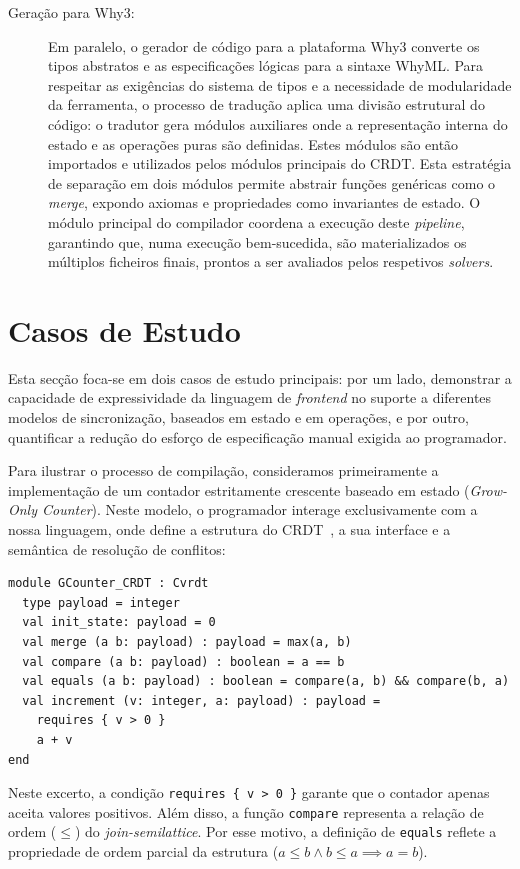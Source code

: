\documentclass{llncs}
\begin{document}
\begin{description}
\item[Geração para Why3:] Em paralelo, o gerador de código para a plataforma Why3 converte os tipos abstratos e
as especificações lógicas para a sintaxe WhyML. Para respeitar as exigências do sistema de tipos e
a necessidade de modularidade da ferramenta, o processo de tradução aplica uma divisão estrutural do código:
o tradutor gera módulos auxiliares onde a representação interna do estado e as operações puras são definidas.
Estes módulos são então importados e utilizados pelos módulos principais do CRDT.
Esta estratégia de separação em dois módulos permite abstrair funções genéricas como o \textit{merge},
expondo axiomas e propriedades como invariantes de estado. O módulo principal do compilador coordena a execução deste \textit{pipeline},
garantindo que, numa execução bem-sucedida, são materializados os múltiplos ficheiros finais,
prontos a ser avaliados pelos respetivos \textit{solvers}.
\end{description}

\section{Casos de Estudo}

Esta secção foca-se em dois casos de estudo principais: por um lado,
demonstrar a capacidade de expressividade da linguagem de \textit{frontend} no suporte a diferentes modelos de sincronização,
baseados em estado e em operações, e por outro, quantificar a redução do esforço de especificação manual exigida ao programador.

Para ilustrar o processo de compilação, consideramos primeiramente a implementação de um contador estritamente crescente baseado em estado (\textit{Grow-Only Counter}).
Neste modelo, o programador interage exclusivamente com a nossa linguagem, onde define a estrutura do CRDT~\cite{shapiro2011comprehensive},
a sua interface e a semântica de resolução de conflitos:

\begin{verbatim}
module GCounter_CRDT : Cvrdt
  type payload = integer
  val init_state: payload = 0
  val merge (a b: payload) : payload = max(a, b)
  val compare (a b: payload) : boolean = a == b
  val equals (a b: payload) : boolean = compare(a, b) && compare(b, a)
  val increment (v: integer, a: payload) : payload =
    requires { v > 0 }
    a + v
end
\end{verbatim}

Neste excerto, a condição \texttt{requires \{ v > 0 \}} garante que o contador apenas aceita valores positivos.
Além disso, a função \texttt{compare} representa a relação de ordem ($\le$) do \textit{join-semilattice}.
Por esse motivo, a definição de \texttt{equals} reflete a propriedade de ordem parcial da estrutura ($a \le b \land b \le a \implies a = b$).
\end{document}
